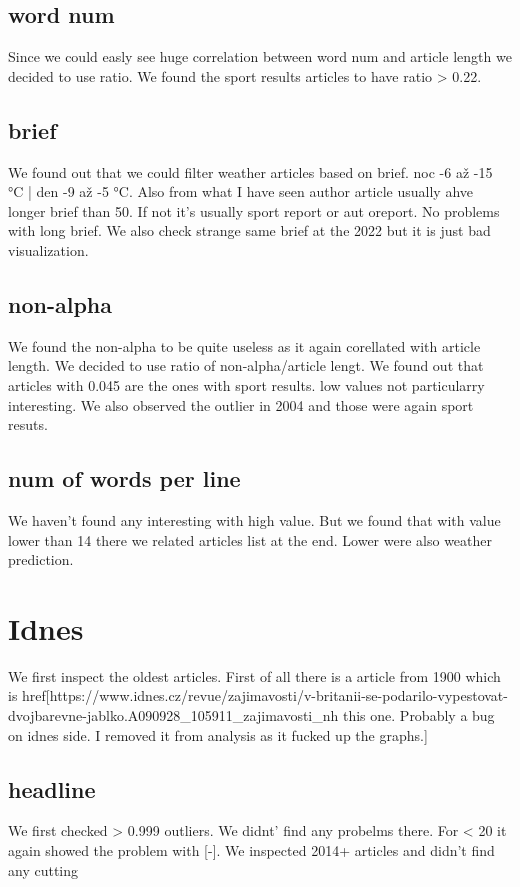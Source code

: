 \documentclass{article}
\begin{document}
    \subsection{word num}
    Since we could easly see huge correlation between word num and article length we decided to use ratio. We found the sport results articles to have ratio > 0.22.



    \subsection{brief}
    We found out that we could filter weather articles based on brief. noc -6 až -15 °C | den -9 až -5 °C. Also from what I have seen author article usually ahve longer brief than 50. If not it's usually sport report or aut oreport.
    No problems with long brief. We also check strange same brief at the 2022 but it is just bad visualization.


    \subsection{non-alpha}
    We found the non-alpha to be quite useless as it again corellated with article length. We decided to use ratio of non-alpha/article lengt. We found out that articles with 0.045 are the ones with sport results. low values not particularry interesting. We also observed the outlier in 2004 and those were again sport resuts.

    \subsection{num of words per line}
    We haven't found any interesting with high value. But we found that with value lower than 14 there we related articles list at the end. Lower were also weather prediction.


    \section{Idnes}
    We first inspect the oldest articles.
    First of all there is a article from 1900 which is href[https://www.idnes.cz/revue/zajimavosti/v-britanii-se-podarilo-vypestovat-dvojbarevne-jablko.A090928_105911_zajimavosti_nh this one. Probably a bug on idnes side. I removed it from analysis as it fucked up the graphs.]




    \subsection{headline}
    We first checked > 0.999 outliers. We didnt' find any probelms there. For < 20 it again showed the problem with [-]. We inspected 2014+ articles and didn't find any cutting
\end{document}
